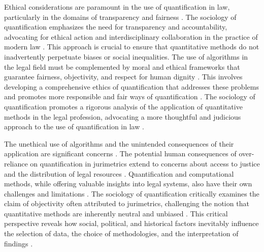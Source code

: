 Ethical considerations are paramount in the use of quantification in law, particularly in the domains of transparency and fairness \cite{10.1057/s41599-020-00557-0,10.1057/s41599-020-0396-5}. The sociology of quantification emphasizes the need for transparency and accountability, advocating for ethical action and interdisciplinary collaboration in the practice of modern law \cite{10.1007/s11186-021-09453-1,salais2016quantification}. This approach is crucial to ensure that quantitative methods do not inadvertently perpetuate biases or social inequalities. The use of algorithms in the legal field must be complemented by moral and ethical frameworks that guarantee fairness, objectivity, and respect for human dignity \cite{10.1590/data.2022.65.3.267,salais2016quantification}. This involves developing a comprehensive ethics of quantification that addresses these problems and promotes more responsible and fair ways of quantification \cite{10.1057/s41599-020-0396-5,10.1057/s41599-020-00557-0}. The sociology of quantification promotes a rigorous analysis of the application of quantitative methods in the legal profession, advocating a more thoughtful and judicious approach to the use of quantification in law \cite{10.1007/s11186-021-09453-1,salais2016quantification}.

The unethical use of algorithms and the unintended consequences of their application are significant concerns \cite{10.1057/s41599-020-0396-5,10.1057/s41599-020-00557-0}. The potential human consequences of over-reliance on quantification in jurimetrics extend to concerns about access to justice and the distribution of legal resources \cite{10.1057/s41599-020-0396-5,de2010jurimetrics,10.1590/data.2022.65.3.267,loevinger1959,10.3390/fi9040068,10.2307/2654208,demortain2019politics,10.5040/9781350220645,10.1080/07329113.2015.1046739,10.1007/s11186-021-09453-1,10.1057/s41599-020-00557-0,comptabilitat0018,salais2016quantification,10.1017/s0003975609000150,10.1017/s0003975609000150,supiot2018,nunes2016jurimetrics,10.1007/s11186-021-09453-1,10.1590/15174522-105471,zabala2019decades}. Quantification and computational methods, while offering valuable insights into legal systems, also have their own challenges and limitations \cite{10.1590/data.2022.65.3.267,10.1057/s41599-020-00557-0}. The sociology of quantification critically examines the claim of objectivity often attributed to jurimetrics, challenging the notion that quantitative methods are inherently neutral and unbiased \cite{10.1590/data.2022.65.3.267,10.1057/s41599-020-00557-0}. This critical perspective reveals how social, political, and historical factors inevitably influence the selection of data, the choice of methodologies, and the interpretation of findings \cite{10.1590/data.2022.65.3.267,salais2016quantification}.

